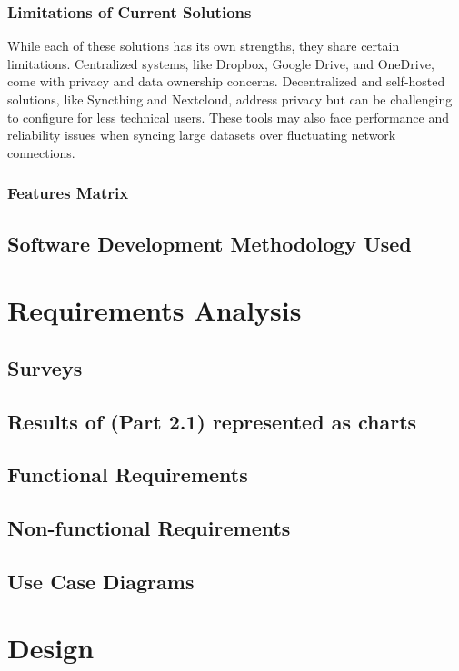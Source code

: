 \documentclass{book}
\begin{document}
\begin{itemize}
      \subsection{Limitations of Current Solutions}
      {
        While each of these solutions has its own strengths, they share certain limitations. Centralized systems, like Dropbox, Google Drive, and OneDrive, come with privacy and data ownership concerns. Decentralized and self-hosted solutions, like Syncthing and Nextcloud, address privacy but can be challenging to configure for less technical users. These tools may also face performance and reliability issues when syncing large datasets over fluctuating network connections.
      }
      \subsection{Features Matrix}
			
		\section{Software Development Methodology Used}
	
	\chapter{Requirements Analysis}
		\section{Surveys}
		
		\section{Results of (Part 2.1) represented as charts}
		
		\section{Functional Requirements}
		
		\section{Non-functional Requirements}
		
		\section{Use Case Diagrams}
	
	\chapter{Design}

\end{itemize}
\end{document}
